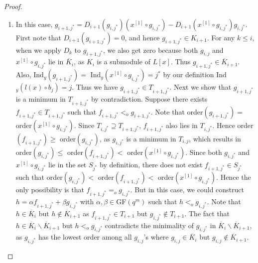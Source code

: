 \documentclass[11pt,onecolumn,draftcls]{IEEEtran}
\begin{document}
\begin{proof}
\begin{enumerate}
\item In this case, $g_{i+1,j^*} = D_{i+1}(g_{i,j^*}) (x^{[1]} \circ g_{i,j^*}) - D_{i+1}(x^{[1]} \circ g_{i,j^*})g_{i,j^*}$. First note that $D_{i+1}(g_{i+1, j^*}) = 0$, and hence $g_{i+1, j^*} \in K_{i+1}$. For any $k \le i$, when we apply $D_k$ to $g_{i+1, j^*}$, we also get zero because both $g_{i,j}$ and $x^{[1]} \circ g_{i,j^*}$ lie in $\overline{K}_i$, as $K_i$ is a submodule of $L[x]$. Thus $g_{i+1, j^*} \in \overline{K}_{i+1}$. Also, Ind$_y (g_{i+1, j^*})=$ Ind$_y (x^{[1]} \circ g_{i,j^*}) = j^*$ by our definition Ind$_y(l(x)\circ b_j) = j$. Thus we have $g_{i+1, j^*} \in T_{i+1, j^*}$. Next we show that $g_{i+1,j^*}$ is a minimum in $T_{i+1, j^*}$ by contradiction. Suppose there exists $f_{i+1, j^*} \in T_{i+1, j^*}$ such that $f_{i+1, j^*} <_o g_{i+1, j^*}$. Note that order$(g_{i+1, j^*})=$ order$(x^{[1]}\circ g_{i,j^*})$. Since $T_{i, j^*} \supseteq T_{i+1,j^*}$, $f_{i+1, j^*}$ also lies in $T_{i, j^*}$. Hence order$(f_{i+1, j^*}) \ge$ order$(g_{i, j^*})$, as $g_{i, j^*}$ is a minimum in $T_{i, j}$, which results in order$(g_{i, j^*}) \le$ order$(f_{i+1, j^*}) <$ order$(x^{[1]}\circ g_{i,j^*})$. Since both $g_{i, j^*}$ and $x^{[1]}\circ g_{i,j^*}$ lie in the set $S_{j^*}$ by definition, there does not exist $f_{i+1, j^*} \in S_{j^*}$ such that order$(g_{i, j^*}) <$ order$(f_{i+1, j^*}) <$ order$(x^{[1]}\circ g_{i,j^*})$. Hence the only possibility is that $f_{i+1, j^*} =_o g_{i, j^*}$. But in this case, we could construct $h = \alpha f_{i+1, j^*} + \beta g_{i, j^*}$ with $\alpha, \beta \in $GF$(q^m)$ such that $h <_o g_{i, j^*}$. Note that $h \in \overline{K}_i$ but $h \notin \overline{K}_{i+1}$ as $f_{i+1, j^*} \in T_{i+1}$ but $g_{i, j^*} \notin T_{i+1}$. The fact that $h \in \overline{K}_i \backslash \overline{K}_{i+1}$ but $h <_o g_{i, j^*}$ contradicts the minimality of $g_{i, j^*}$ in $\overline{K}_i \backslash \overline{K}_{i+1}$, as $g_{i, j^*}$ has the lowest order among all $g_{i,j}$'s  where $g_{i, j} \in \overline{K}_i$ but $g_{i,j} \notin \overline{K}_{i+1}$.
\end{enumerate}
\end{proof}
\end{document}
